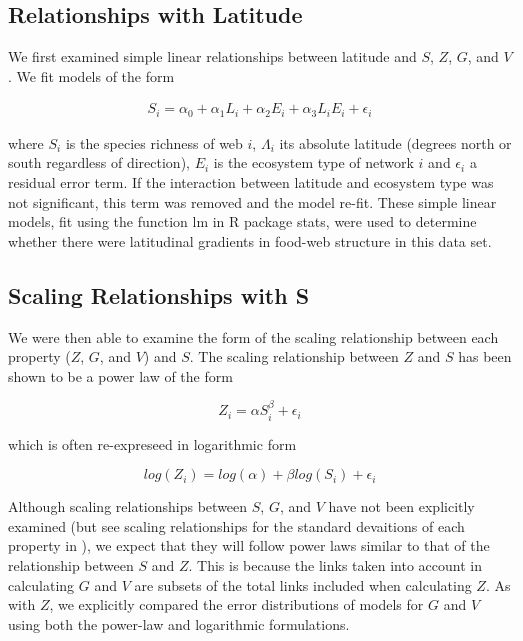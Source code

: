 \documentclass[12pt]{article}
\begin{document}
\subsection*{Relationships with Latitude}

We first examined simple linear relationships between latitude and $S$, $Z$, $G$, and $V$. We fit models of the form

\begin{eqnarray}
S_{i} = \alpha_{0} + \alpha_{1} L_{i} + \alpha_{2} E_{i} + \alpha_{3} L_{i} E_{i} + \epsilon_{i} 
\end{eqnarray}

where $S_{i}$ is the species richness of web $i$, $\Lambda_{i}$ its absolute
latitude (degrees north or south  regardless of direction), $E_{i}$ is the
ecosystem type of network $i$ and $\epsilon_{i}$ a residual error term. If the
interaction between latitude and ecosystem type was not significant, this term
was removed and the model re-fit. These simple linear models, fit using the
function lm in R \citep{R} package stats, were used to determine whether there
were latitudinal gradients in food-web structure in this data set.


\subsection*{Scaling Relationships with S}

We were then able to examine the form of the scaling relationship between each property ($Z$, $G$, and $V$) and $S$.
The scaling relationship between $Z$ and $S$ has been shown to be a power law \citep{Riede2010} of the form 

\begin{equation}
\label{Power}
Z_{i}=\alpha S_{i}^{\beta} + \epsilon_{i} 
\end{equation}

which is often re-expreseed in logarithmic form 

\begin{equation}
\label{Loglog}
log(Z_{i}) = log(\alpha) + \beta log(S_{i}) + \epsilon_{i}  
\end{equation}

Although scaling relationships between $S$, $G$, and $V$ have not been explicitly examined (but see scaling 
relationships for the standard devaitions of each property in \citet{Riede2010}), we expect that they will follow
power laws similar to that of the relationship between $S$ and $Z$. This is because the links taken into account in
calculating $G$ and $V$ are subsets of the total links included when calculating $Z$. As with $Z$, we explicitly 
compared the error distributions of models for $G$ and $V$ using both the power-law and logarithmic formulations. 
\end{document}
